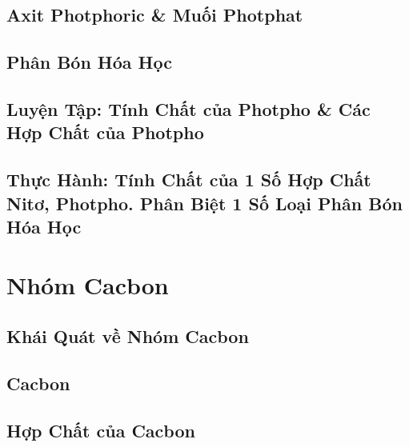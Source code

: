 \documentclass[oneside]{book}
\numberwithin{equation}{section}
\begin{document}

\section{Axit Photphoric \& Muối Photphat}


\section{Phân Bón Hóa Học}


\section{Luyện Tập: Tính Chất của Photpho \& Các Hợp Chất của Photpho}


\section{Thực Hành: Tính Chất của 1 Số Hợp Chất Nitơ, Photpho. Phân Biệt 1 Số Loại Phân Bón Hóa Học}


\chapter{Nhóm Cacbon}

\section{Khái Quát về Nhóm Cacbon}


\section{Cacbon}


\section{Hợp Chất của Cacbon}
\end{document}
